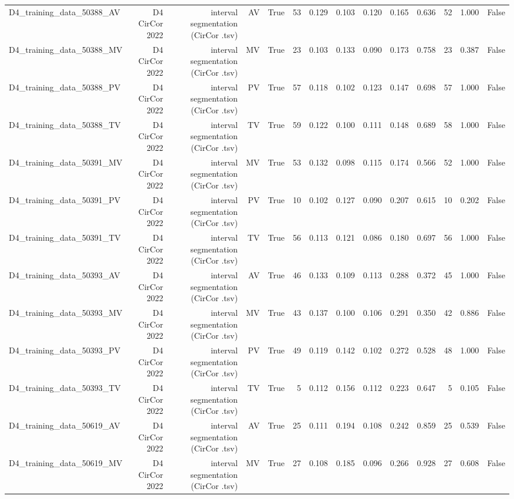 \begin{table}[htbp]
\begin{tabular}{lrrrrrrrrrrrrr}
    D4\_training\_data\_50388\_AV & D4 CirCor 2022 & interval segmentation (CirCor .tsv) & AV & True & 53 & 0.129 & 0.103 & 0.120 & 0.165 & 0.636 & 52 & 1.000 & False \\
    D4\_training\_data\_50388\_MV & D4 CirCor 2022 & interval segmentation (CirCor .tsv) & MV & True & 23 & 0.103 & 0.133 & 0.090 & 0.173 & 0.758 & 23 & 0.387 & False \\
    D4\_training\_data\_50388\_PV & D4 CirCor 2022 & interval segmentation (CirCor .tsv) & PV & True & 57 & 0.118 & 0.102 & 0.123 & 0.147 & 0.698 & 57 & 1.000 & False \\
    D4\_training\_data\_50388\_TV & D4 CirCor 2022 & interval segmentation (CirCor .tsv) & TV & True & 59 & 0.122 & 0.100 & 0.111 & 0.148 & 0.689 & 58 & 1.000 & False \\
    D4\_training\_data\_50391\_MV & D4 CirCor 2022 & interval segmentation (CirCor .tsv) & MV & True & 53 & 0.132 & 0.098 & 0.115 & 0.174 & 0.566 & 52 & 1.000 & False \\
    D4\_training\_data\_50391\_PV & D4 CirCor 2022 & interval segmentation (CirCor .tsv) & PV & True & 10 & 0.102 & 0.127 & 0.090 & 0.207 & 0.615 & 10 & 0.202 & False \\
    D4\_training\_data\_50391\_TV & D4 CirCor 2022 & interval segmentation (CirCor .tsv) & TV & True & 56 & 0.113 & 0.121 & 0.086 & 0.180 & 0.697 & 56 & 1.000 & False \\
    D4\_training\_data\_50393\_AV & D4 CirCor 2022 & interval segmentation (CirCor .tsv) & AV & True & 46 & 0.133 & 0.109 & 0.113 & 0.288 & 0.372 & 45 & 1.000 & False \\
    D4\_training\_data\_50393\_MV & D4 CirCor 2022 & interval segmentation (CirCor .tsv) & MV & True & 43 & 0.137 & 0.100 & 0.106 & 0.291 & 0.350 & 42 & 0.886 & False \\
    D4\_training\_data\_50393\_PV & D4 CirCor 2022 & interval segmentation (CirCor .tsv) & PV & True & 49 & 0.119 & 0.142 & 0.102 & 0.272 & 0.528 & 48 & 1.000 & False \\
    D4\_training\_data\_50393\_TV & D4 CirCor 2022 & interval segmentation (CirCor .tsv) & TV & True & 5 & 0.112 & 0.156 & 0.112 & 0.223 & 0.647 & 5 & 0.105 & False \\
    D4\_training\_data\_50619\_AV & D4 CirCor 2022 & interval segmentation (CirCor .tsv) & AV & True & 25 & 0.111 & 0.194 & 0.108 & 0.242 & 0.859 & 25 & 0.539 & False \\
    D4\_training\_data\_50619\_MV & D4 CirCor 2022 & interval segmentation (CirCor .tsv) & MV & True & 27 & 0.108 & 0.185 & 0.096 & 0.266 & 0.928 & 27 & 0.608 & False \\

\end{tabular}
\end{table}
